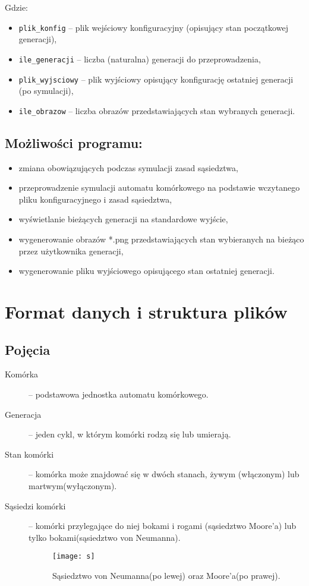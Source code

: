 \documentclass[a4paper,11pt, notitlepage ]{article}
\begin{document}
Gdzie: 
\begin{itemize}
\item \verb+plik_konfig+ – plik wejściowy konfiguracyjny (opisujący stan początkowej generacji),
\item \verb+ile_generacji+ – liczba (naturalna) generacji do przeprowadzenia,
\item \verb+plik_wyjsciowy+ – plik wyjściowy opisujący konfigurację ostatniej generacji (po symulacji),
\item \verb+ile_obrazow+ – liczba obrazów przedstawiających stan wybranych generacji.
\end{itemize}
\subsection{Możliwości programu:}
\begin{itemize}
\item zmiana obowiązujących podczas symulacji zasad sąsiedztwa,
\item przeprowadzenie symulacji automatu komórkowego na podstawie wczytanego pliku konfiguracyjnego i zasad sąsiedztwa,
\item wyświetlanie bieżących generacji na standardowe wyjście,
\item wygenerowanie obrazów *.png przedstawiających stan wybieranych na bieżąco przez użytkownika generacji,
\item wygenerowanie pliku wyjściowego opisującego stan ostatniej generacji.
\end{itemize}
\section{Format danych i struktura plików}
\subsection{Pojęcia}
\begin{description}
\item[Komórka] – podstawowa jednostka automatu komórkowego.
\item[Generacja] – jeden cykl, w którym komórki rodzą się lub umierają.
\item[Stan komórki] – komórka może znajdować się w dwóch stanach, żywym (włączonym) lub martwym(wyłączonym).
\item[Sąsiedzi komórki] – komórki przylegające do niej bokami i rogami (sąsiedztwo Moore’a) lub tylko bokami(sąsiedztwo von Neumanna).
\begin{figure}[h]
\centering
\texttt{[image: s]}
\caption{Sąsiedztwo von Neumanna(po lewej) oraz Moore'a(po prawej).}
\end{figure}
\end{description}
\end{document}
